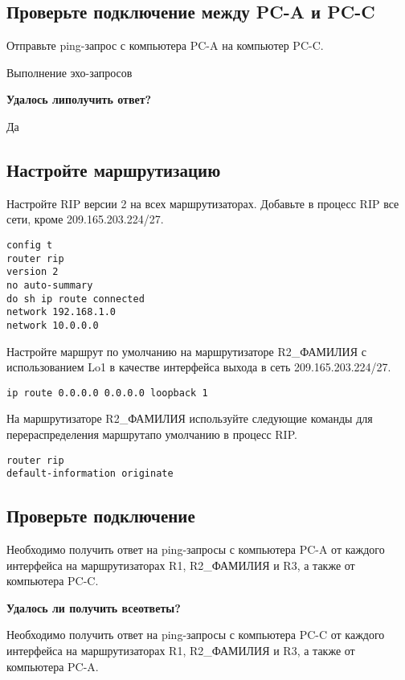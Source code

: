 \subsection{Проверьте подключение между PC-A и PC-C}

Отправьте ping-запрос с компьютера PC-A на компьютер PC-C.

\begin{image}
	\caption{Выполнение эхо-запросов}
\end{image}

\textbf{Удалось липолучить ответ?}

Да

\subsection{Настройте маршрутизацию}

Настройте RIP версии 2 на всех маршрутизаторах.
Добавьте в процесс RIP все сети, кроме 209.165.203.224/27.

\begin{verbatim}
config t
router rip
version 2
no auto-summary
do sh ip route connected
network 192.168.1.0
network 10.0.0.0
\end{verbatim}

Настройте маршрут по умолчанию на маршрутизаторе R2\_ФАМИЛИЯ
с использованием Lo1 в качестве интерфейса выхода в сеть 209.165.203.224/27.

\begin{verbatim}
ip route 0.0.0.0 0.0.0.0 loopback 1
\end{verbatim}

На маршрутизаторе R2\_ФАМИЛИЯ используйте следующие команды
для перераспределения маршрутапо умолчанию в процесс RIP.

\begin{verbatim}
router rip
default-information originate
\end{verbatim}

\subsection{Проверьте подключение}

Необходимо получить ответ на ping-запросы с компьютера PC-A
от каждого интерфейса на маршрутизаторах R1, R2\_ФАМИЛИЯ и R3,
а также от компьютера PC-C.


\textbf{Удалось ли получить всеответы?}

Необходимо получить ответ на ping-запросы с компьютера PC-C
от каждого интерфейса на маршрутизаторах R1, R2\_ФАМИЛИЯ и R3,
а также от компьютера PC-A.

